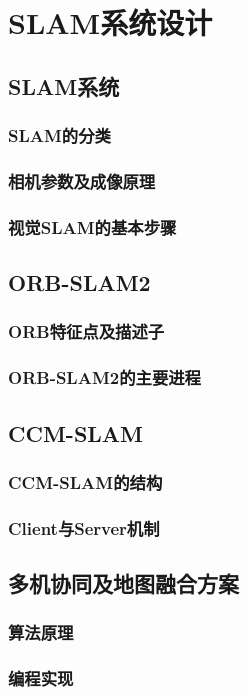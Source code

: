 \chapter{SLAM系统设计} \label{System Overview}


\section{SLAM系统}

\subsection{SLAM的分类} \label{3.1.1}
\subsection{相机参数及成像原理} \label{3.1.2}
\subsection{视觉SLAM的基本步骤} \label{3.1.3}


\section{ORB-SLAM2}

\subsection{ORB特征点及描述子} \label{3.2.1}
\subsection{ORB-SLAM2的主要进程} \label{3.2.2}


\section{CCM-SLAM}

\subsection{CCM-SLAM的结构} \label{3.3.1}
\subsection{Client与Server机制} \label{3.3.2}


\section{多机协同及地图融合方案}

\subsection{算法原理} \label{3.4.1}
\subsection{编程实现} \label{3.4.2}